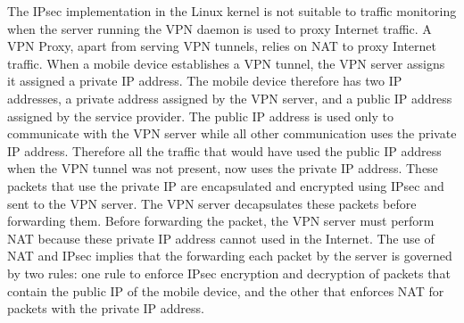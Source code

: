 The IPsec implementation in the Linux kernel is not suitable to
traffic monitoring when the server running the VPN daemon is used to
proxy Internet traffic.  A VPN Proxy, apart from serving VPN tunnels,
relies on NAT to proxy Internet traffic.  When a mobile device
establishes a VPN tunnel, the VPN server assigns it assigned a private
IP address.  The mobile device therefore has two IP addresses, a
private address assigned by the VPN server, and a public IP address
assigned by the service provider.  The public IP address is used only
to communicate with the VPN server while all other communication uses
the private IP address.  Therefore all the traffic that would have
used the public IP address when the VPN tunnel was not present, now
uses the private IP address.  These packets that use the private IP
are encapsulated and encrypted using IPsec and sent to the VPN server.
The VPN server decapsulates these packets before forwarding them.
Before forwarding the packet, the VPN server must perform NAT because
these private IP address cannot used in the Internet.  The use of NAT
and IPsec implies that the forwarding each packet by the server is
governed by two rules: one rule to enforce IPsec encryption and
decryption of packets that contain the public IP of the mobile device,
and the other that enforces NAT for packets with the private IP
address.

